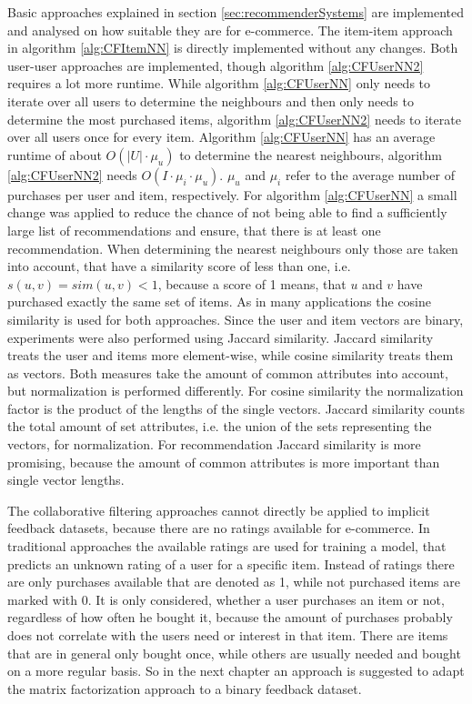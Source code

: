 \documentclass[10pt]{reportMaster}
\begin{document}
Basic approaches explained in section \ref{sec:recommenderSystems} are implemented and analysed on how suitable they are for e-commerce.
The item-item approach in algorithm \ref{alg:CFItemNN} is directly implemented without any changes.
Both user-user approaches are implemented, though algorithm \ref{alg:CFUserNN2} requires a lot more runtime.
While algorithm \ref{alg:CFUserNN} only needs to iterate over all users to determine the neighbours and then only needs to determine the most purchased items, algorithm \ref{alg:CFUserNN2} needs to iterate over all users once for every item.
Algorithm \ref{alg:CFUserNN} has an average runtime of about $O(|U| \cdot \mu_u)$ to determine the nearest neighbours, algorithm \ref{alg:CFUserNN2} needs $O(I \cdot \mu_i \cdot \mu_u)$.
$\mu_u$ and $\mu_i$ refer to the average number of purchases per user and item, respectively.
For algorithm \ref{alg:CFUserNN} a small change was applied to reduce the chance of not being able to find a sufficiently large list of recommendations and ensure, that there is at least one recommendation.
When determining the nearest neighbours only those are taken into account, that have a similarity score of less than one, i.e. $s(u,v) = sim(u, v) < 1$, because a score of 1 means, that $u$ and $v$ have purchased exactly the same set of items.
As in many applications the cosine similarity is used for both approaches.
Since the user and item vectors are binary, experiments were also performed using Jaccard similarity.
Jaccard similarity treats the user and items more element-wise, while cosine similarity treats them as vectors.
Both measures take the amount of common attributes into account, but normalization is performed differently.
For cosine similarity the normalization factor is the product of the lengths of the single vectors.
Jaccard similarity counts the total amount of set attributes, i.e. the union of the sets representing the vectors, for normalization.
For recommendation Jaccard similarity is more promising, because the amount of common attributes is more important than single vector lengths.

The collaborative filtering approaches cannot directly be applied to implicit feedback datasets, because there are no ratings available for e-commerce.
In traditional approaches the available ratings are used for training a model, that predicts an unknown rating of a user for a specific item.
Instead of ratings there are only purchases available that are denoted as 1, while not purchased items are marked with 0.
It is only considered, whether a user purchases an item or not, regardless of how often he bought it, because the amount of purchases probably does not correlate with the users need or interest in that item.
There are items that are in general only bought once, while others are usually needed and bought on a more regular basis. 
So in the next chapter an approach is suggested to adapt the matrix factorization approach to a binary feedback dataset.
\end{document}

